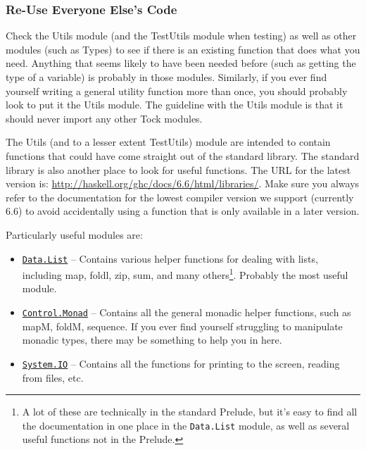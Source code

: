 \documentclass[a4wide]{article}
\begin{document}
\subsubsection{Re-Use Everyone Else's Code}

Check the Utils module (and the TestUtils
module when testing) as well as other modules (such as Types) to see if there is an existing function
that does what you need.  Anything that seems likely to have been needed before (such as getting the
type of a variable) is probably in those modules.  Similarly, if you ever find yourself writing
a general utility function more than once, you should probably look to put it the Utils module.  The guideline
with the Utils module is that it should never import any other Tock modules.

The Utils (and to a lesser extent TestUtils) module are intended to contain functions that could have
come straight out of the standard library.  The standard library is also another place to look for
useful functions.  The URL for the latest version is: \url{http://haskell.org/ghc/docs/6.6/html/libraries/}.
Make sure you always refer to the documentation for the lowest compiler version we support (currently
6.6) to avoid accidentally using a function that is only available in a later version.

Particularly useful modules are:

\begin{itemize}
\item \href{http://haskell.org/ghc/docs/6.6/html/libraries/base/Data-List.html}{\lstinline|Data.List|}
  -- Contains various helper functions for dealing with lists, including map,
foldl, zip, sum, and many others\footnote{A lot of these are technically in the standard Prelude, but
it's easy to find all the documentation in one place in the \lstinline|Data.List| module, as well
as several useful functions not in the Prelude.}.  Probably the most useful module.
\item \href{http://haskell.org/ghc/docs/6.6/html/libraries/base/Control-Monad.html}{\lstinline|Control.Monad|}
  -- Contains all the general monadic helper functions, such as
mapM, foldM, sequence.  If you ever find yourself struggling to manipulate monadic types, there
may be something to help you in here.
\item \href{http://haskell.org/ghc/docs/6.6/html/libraries/base/Control-Monad.html}{\lstinline|System.IO|}
  -- Contains all the functions for printing to the screen, reading from
files, etc.
\end{itemize}
\end{document}
